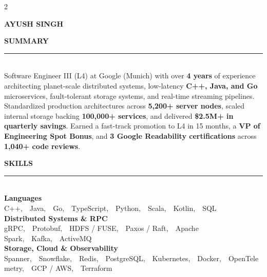 \documentclass[letterpaper,10pt]{article}
\newcommand{\sidebarSection}[1]{%
  \vspace{7.5pt}%
  {\fontsize{9.8}{11.2}\selectfont\bfseries\color{white}\MakeUppercase{#1}}\\[-4pt]
  {\color{SidebarRule}\rule{\linewidth}{0.7pt}}\\[3.5pt]
}
\newcommand{\sidebarSkillGroup}[2]{%
  \vspace{2.5pt}%
  {\fontsize{8.4}{9.8}\selectfont\bfseries\color{white}#1}\\[1.5pt]
  {\fontsize{7.9}{10.2}\selectfont\color{SidebarMuted}#2}\\[2.5pt]
}
\newcommand{\sDot}{{\fontsize{1}{1}\selectfont\color{SidebarTeal!99!white},}\ \textperiodcentered\ }
\begin{document}

\setlength{\columnsep}{21pt}
\begin{paracol}{2}

\vspace{1pt}
{\fontsize{20.5}{23.5}\selectfont\bfseries\color{white}AYUSH SINGH}
\vspace{3pt}

\sidebarSection{SUMMARY}
{\fontsize{7.95}{9.9}\selectfont\color{SidebarMuted}
Software Engineer III (L4) at Google (Munich) with over \textbf{\color{white}4 years} of experience architecting planet-scale distributed systems, low-latency \textbf{\color{white}C++, Java, and Go} microservices, fault-tolerant storage systems, and real-time streaming pipelines. Standardized production architectures across \textbf{\color{white}5,200+ server nodes}, scaled internal storage backing \textbf{\color{white}100,000+ services}, and delivered \textbf{\color{white}\$2.5M+ in quarterly savings}. Earned a fast-track promotion to L4 in 15 months, a \textbf{\color{white}VP of Engineering Spot Bonus}, and \textbf{\color{white}3 Google Readability certifications} across \textbf{\color{white}1,040+ code reviews}.
}

\sidebarSection{SKILLS}

\sidebarSkillGroup{Languages}{%
  C++\sDot Java\sDot Go\sDot TypeScript\sDot Python\sDot Scala\sDot Kotlin\sDot SQL%
}

\sidebarSkillGroup{Distributed Systems \& RPC}{%
  gRPC\sDot Protobuf\sDot HDFS / FUSE\sDot Paxos / Raft\sDot Apache Spark\sDot Kafka\sDot ActiveMQ%
}

\sidebarSkillGroup{Storage, Cloud \& Observability}{%
  Spanner\sDot Snowflake\sDot Redis\sDot PostgreSQL\sDot Kubernetes\sDot Docker\sDot OpenTelemetry\sDot GCP / AWS\sDot Terraform%
}


\end{paracol}
\end{document}
